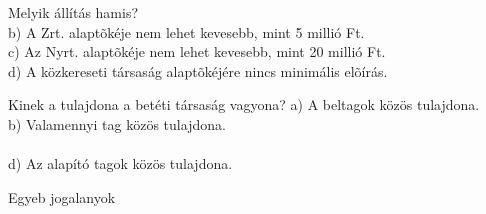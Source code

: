 \begin{frame}

\begin{tcolorbox}[title={77. Kérdés}]
Melyik állítás hamis?
\tcblower
{}\\
b) A Zrt. alaptõkéje nem lehet kevesebb, mint 5 millió Ft.\\
c) Az Nyrt. alaptõkéje nem lehet kevesebb, mint 20 millió Ft.\\
d) A közkereseti társaság alaptõkéjére nincs minimális elõírás.
\end{tcolorbox}

\begin{tcolorbox}[title={78. Kérdés}]
Kinek a tulajdona a betéti társaság vagyona?
\tcblower
a) A beltagok közös tulajdona.\\
b) Valamennyi tag közös tulajdona.\\
\\
d) Az alapító tagok közös tulajdona.
\end{tcolorbox}

\end{frame}

\begin{frame}[plain]
\begin{tcolorbox}[center, colback={myyellow}, coltext={black}, colframe={myyellow}]
    { Egyeb jogalanyok}\\
\end{tcolorbox}
\end{frame}

